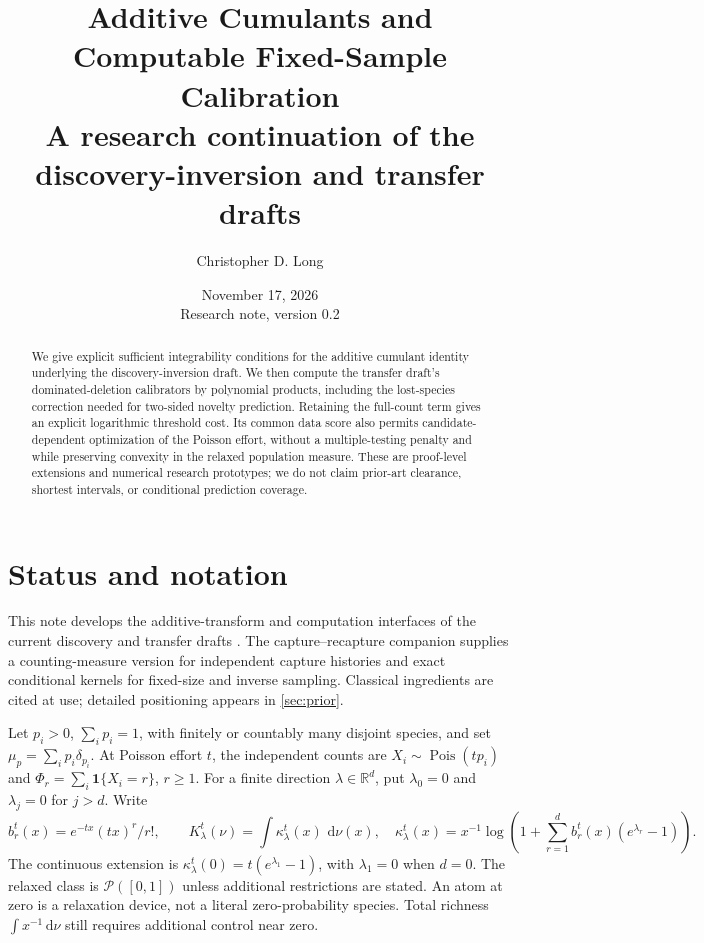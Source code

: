 \documentclass[11pt]{article}
\title{Additive Cumulants and Computable Fixed-Sample Calibration\\
\large A research continuation of the discovery-inversion and transfer drafts}
\author{Christopher D. Long}
\date{November 17, 2026\\Research note, version 0.2}
\theoremstyle{remark}\newtheorem{remark}[theorem]{Remark}
\newcommand{\R}{\mathbb R}\newcommand{\N}{\mathbb N}
\newcommand{\dd}{\,\mathrm d}\newcommand{\ind}{\mathbf1}
\newcommand{\Pois}{\operatorname{Pois}}
\begin{document}
\maketitle
\begin{abstract}
We give explicit sufficient integrability conditions for the additive cumulant
identity underlying the discovery-inversion draft. We then compute the transfer
draft's dominated-deletion calibrators by polynomial products, including the
lost-species correction needed for two-sided novelty prediction. Retaining the
full-count term gives an explicit logarithmic threshold cost. Its common data
score also permits candidate-dependent optimization of the Poisson effort,
without a multiple-testing penalty and while preserving convexity in the
relaxed population measure. These are proof-level extensions and numerical
research prototypes; we do not claim prior-art clearance, shortest intervals,
or conditional prediction coverage.
\end{abstract}

\section{Status and notation}
This note develops the additive-transform and computation interfaces of the
current discovery and transfer drafts \cite{LongDiscovery,LongTransfer}.
The capture--recapture companion \cite{LongCapture} supplies a counting-measure
version for independent capture histories and exact conditional kernels for
fixed-size and inverse sampling. Classical ingredients are cited at use;
detailed positioning appears in \cref{sec:prior}.

Let $p_i>0$, $\sum_i p_i=1$, with finitely or countably many disjoint species,
and set $\mu_p=\sum_i p_i\delta_{p_i}$. At Poisson effort $t$, the independent
counts are $X_i\sim\Pois(tp_i)$ and
$\Phi_r=\sum_i\ind\{X_i=r\}$, $r\ge1$.
For a finite direction $\lambda\in\R^d$, put $\lambda_0=0$ and
$\lambda_j=0$ for $j>d$. Write
\[
 b_r^t(x)=e^{-tx}(tx)^r/r!,\qquad
 K_\lambda^t(\nu)=\int \kappa_\lambda^t(x)\,\dd\nu(x),\quad
 \kappa_\lambda^t(x)=x^{-1}\log\!\left(1+
 \sum_{r=1}^d b_r^t(x)(e^{\lambda_r}-1)\right).
\]
The continuous extension is $\kappa_\lambda^t(0)=t(e^{\lambda_1}-1)$,
with $\lambda_1=0$ when $d=0$. The relaxed class is
$\mathcal P([0,1])$ unless additional restrictions are stated.
An atom at zero is a relaxation device, not a literal zero-probability species.
Total richness $\int x^{-1}\dd\nu$ still requires additional control near zero.
\end{document}
